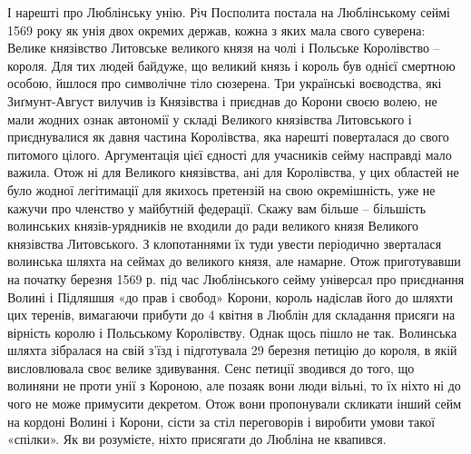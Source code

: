 І нарешті про Люблінську унію.  Річ Посполита постала на Люблінському сеймі
1569 року як унія двох окремих держав, кожна з яких мала свого суверена: Велике
князівство Литовське великого князя на чолі і Польське Королівство – короля.
Для тих людей байдуже, що великий князь і король був однієї смертною особою,
йшлося про символічне тіло сюзерена. Три українські воєводства, які
Зиґмунт-Август вилучив із Князівства і приєднав до Корони своєю волею, не мали
жодних ознак автономії у складі Великого князівства Литовського і приєднувалися
як давня частина Королівства, яка нарешті поверталася до свого питомого цілого.
Аргументація цієї єдності для учасників сейму насправді мало важила. Отож ні
для Великого князівства, ані для Королівства, у цих областей не було жодної
легітимації для якихось претензій на свою окремішність, уже не кажучи про
членство у майбутній федерації. Скажу вам більше – більшість волинських
князів-урядників не входили до ради великого князя Великого князівства
Литовського. З клопотаннями їх туди увести періодично зверталася волинська
шляхта на сеймах до великого князя, але намарне. Отож приготувавши на початку
березня 1569 р. під час Люблінського сейму універсал про приєднання Волині і
Підляшшя «до прав і свобод» Корони, король надіслав його до шляхти цих теренів,
вимагаючи прибути до 4 квітня в Люблін для складання присяги на вірність королю
і Польському Королівству. Однак щось пішло не так. Волинська шляхта зібралася
на свій з’їзд і підготувала 29 березня петицію до короля, в якій висловлювала
своє велике здивування. Сенс петиції зводився до того, що волиняни не проти
унії з Короною, але позаяк вони люди вільні, то їх ніхто ні до чого не може
примусити декретом. Отож вони пропонували скликати інший сейм на кордоні Волині
і Корони, сісти за стіл переговорів і виробити умови такої «спілки». Як ви
розумієте, ніхто присягати до Любліна не квапився. 

